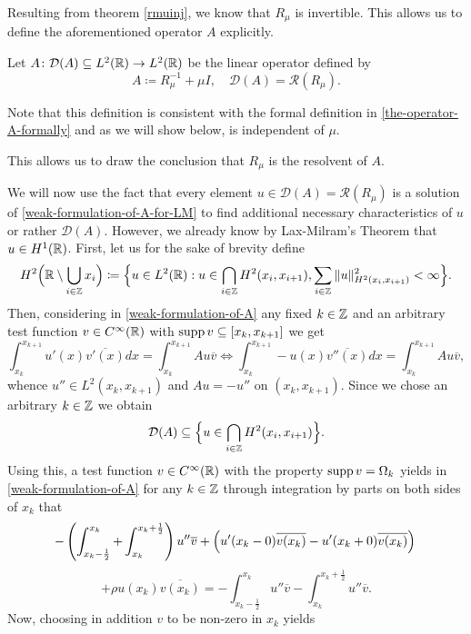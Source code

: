 Resulting from theorem \ref{rmuinj}, we know that $R_{\mu}$ is invertible. This allows us to define the aforementioned operator $A$ explicitly.
\begin{definition}
	Let $A \colon \mathcal{D}(A) \subseteq L^{2}(\mathbb{R}) \rightarrow L^{2}(\mathbb{R})$ be the linear operator defined by
	\[ A \coloneqq R_{\mu}^{-1} + \mu I, \quad \mathcal{D}(A) = \mathcal{R}(R_{\mu}). \]
\end{definition}
Note that this definition is consistent with the formal definition in \eqref{the-operator-A-formally} and as we will show below, is independent of $\mu$. 
\begin{remark}
	This allows us to draw the conclusion that $R_{\mu}$ is the resolvent of $A$.
\end{remark}
We will now use the fact that every element $u \in \mathcal{D}(A) = \mathcal{R}(R_{\mu})$ is a solution of \eqref{weak-formulation-of-A-for-LM} to find additional necessary  characteristics of $u$ or rather $\mathcal{D}(A)$. However, we already know by Lax-Milram's Theorem that $u \in H^{1}(\mathbb{R})$. First, let us for the sake of brevity define
\[ H^{2}\Big(\mathbb{R} \setminus \bigcup_{i \in \mathbb{Z}} x_{i} \Big) \coloneqq \Big\{ u \in L^{2}(\mathbb{R}) : u \in \bigcap_{i \in \mathbb{Z}} H^{2}(x_{i}, x_{i+1}), \sum_{i \in \mathbb{Z}} \|u\|^{2}_{H^{2}(x_{i}, x_{i+1})} < \infty \Big\}. \]
Then, considering in \eqref{weak-formulation-of-A} any fixed $k \in \mathbb{Z}$ and an arbitrary test function $v \in C^{\infty}(\mathbb{R})$ with $\operatorname{supp} v \subseteq [x_{k}, x_{k+1}]$ we get 
	\[ \int_{x_{k}}^{x_{k + 1}} u'(x) \overline{v'(x)} dx = \int_{x_{k}}^{x_{k+1}} A u  \overline{v} \iff \int_{x_{k}}^{x_{k+1}} - u(x) \overline{v''(x)} dx = \int_{x_{k}}^{x_{k+1}} A u \overline{v}, \]
whence $u'' \in L^{2}(x_{k}, x_{k + 1})$ and $A u = - u''$ on $(x_{k}, x_{k + 1})$. Since we chose an arbitrary $k \in \mathbb{Z}$ we obtain 
	$$ \mathcal{D}(A) \subseteq \Big\{ u \in \bigcap_{i \in \mathbb{Z}} H^{2}(x_{i}, x_{i+1}) \Big\}. $$
Using this, a test function $v \in C^{\infty}(\mathbb{R})$ with the property $\operatorname{supp} v = \Omega_{k}$ yields in \eqref{weak-formulation-of-A} for any $k \in \mathbb{Z}$ through integration by parts on both sides of $x_{k}$ that
	\[ -\left( \int_{x_{k}-\frac{1}{2}}^{x_{k}} + \int_{x_{k}}^{x_{k} + \frac{1}{2}}\right) u'' \overline{v} + \left( u'(x_{k}-0) \overline{v(x_{k})} - u'(x_{k} + 0) \overline{v(x_{k})} \right) \\ \]
	\[ +  \rho u(x_{k})\overline{v(x_{k})} = - \int_{x_{k} - \frac{1}{2}}^{x_{k}} u'' \overline{v} - \int_{x_{k}}^{x_{k} + \frac{1}{2}} u'' \overline{v}. \]
Now, choosing in addition $v$ to be non-zero in $x_{k}$ yields 
